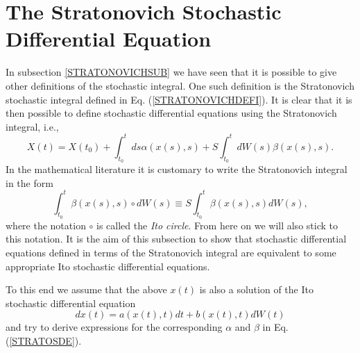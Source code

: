 \section{The Stratonovich Stochastic Differential Equation}
In subsection \ref{STRATONOVICHSUB} we have seen that it is 
possible to give other definitions of the stochastic integral.
One such definition is the Stratonovich stochastic integral defined 
in Eq. (\ref{STRATONOVICHDEFI}). It is clear that it is then possible 
to define stochastic differential equations using the 
Stratonovich integral, i.e.,
\begin{equation}
\label{STRATOSDE}
X(t) = X(t_0) + \int_{t_0}^t ds \alpha(x(s),s) +
      S \int_{t_0}^t dW(s) \beta(x(s),s).
\end{equation}
In the mathematical literature it is customary to write
the Stratonovich integral in the form
\begin{equation*}
\int_{t_0}^t  \beta(x(s),s) \circ dW(s) 
\equiv S\int_{t_0}^t  \beta(x(s),s) dW(s) ,
\end{equation*}
where the notation $\circ$ is called the {\em Ito circle}. From
here on we will also stick to this notation.
It is the aim of this subsection to show that stochastic 
differential equations defined in terms of the Stratonovich 
integral are equivalent to some appropriate Ito stochastic 
differential equations.

To this end we assume that the above $x(t)$ is also a solution of the Ito 
stochastic differential equation
\begin{equation}
\label{ITOSDEINS}
dx(t) = a(x(t),t) dt + b(x(t),t) dW(t)
\end{equation}
and try to derive expressions for the corresponding $\alpha$ and $\beta$
in Eq. (\ref{STRATOSDE}).

